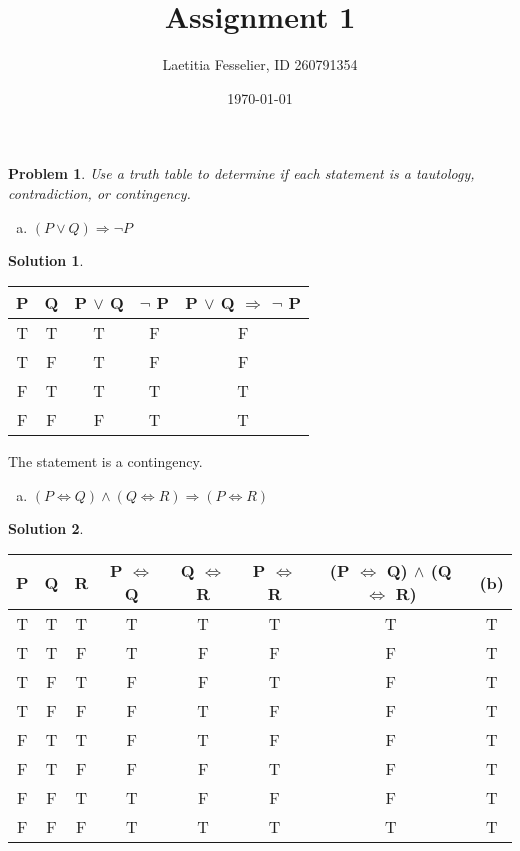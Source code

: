 \documentclass{article}
\newtheorem{problem}{Problem}
\theoremstyle{definition}
\newtheorem*{solution}{Solution}
\begin{document}
 \title{Assignment 1} 

\author{Laetitia Fesselier, ID 260791354} 

\date{\today}

\maketitle

\begin{problem} 
Use a truth table to determine if each statement is a tautology, contradiction, or contingency.
\end{problem}

\begin{enumerate}[(a)]
\item \((P \lor Q) \Rightarrow \neg P\)
\end{enumerate}


\begin{solution}
\end{solution}

\begin{tabular}{|c|c|c|c|c|}
  \hline
  P & Q & P $\lor$ Q & $\neg$ P &   P $\lor$ Q  $\Rightarrow$ $\neg$ P \\
  \hline
  T & T & T & F & F \\
  T & F & T & F & F \\
  F & T & T & T & T \\
  F & F & F & T & T \\
  \hline
\end{tabular}
\medskip \par

The statement is a contingency.\\

\begin{enumerate}[(b)]
\item \(( P \Leftrightarrow Q) \land (Q \Leftrightarrow R) \Rightarrow (P \Leftrightarrow R)\)
\end{enumerate}

\begin{solution}
\end{solution}

\begin{tabular}{|c|c|c|c|c|c|c|c|}
  \hline
  P & Q & R & P $\Leftrightarrow$ Q & Q $\Leftrightarrow$ R &  P $\Leftrightarrow$ R & (P $\Leftrightarrow$ Q) $\land$ (Q $\Leftrightarrow$ R) & (b) \\
  \hline
  T & T & T & T & T & T & T & T \\
  T & T & F & T & F & F & F & T \\
  T & F & T & F & F & T & F & T \\
  T & F & F & F & T & F & F & T \\
  F & T & T & F & T & F & F & T \\
  F & T & F & F & F & T & F & T \\
  F & F & T & T & F & F & F & T \\
  F & F & F & T & T & T & T & T \\
  \hline
\end{tabular}
\medskip \par
\end{document}
